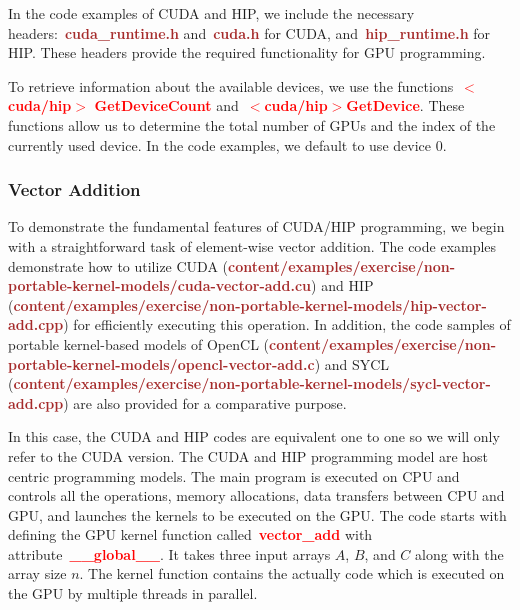 


\par
In the code examples of CUDA and HIP, we include the necessary headers:~\textbf{\textcolor{brown}{cuda\_runtime.h}} and~\textbf{\textcolor{brown}{cuda.h}} for CUDA, and~\textbf{\textcolor{brown}{hip\_runtime.h}} for HIP.
These headers provide the required functionality for GPU programming.


\par
To retrieve information about the available devices, we use the functions~\textbf{\textcolor{red}{$<$cuda/hip$>$}} \textbf{\textcolor{red}{GetDeviceCount}} and~\textbf{\textcolor{red}{$<$cuda/hip$>$GetDevice}}.
These functions allow us to determine the total number of GPUs and the index of the currently used device.
In the code examples, we default to use device 0.


\subsubsection{Vector Addition}\label{sec:vector_addition}


\par
To demonstrate the fundamental features of CUDA/HIP programming, we begin with a straightforward task of element-wise vector addition.
The code examples demonstrate how to utilize CUDA (\textbf{\textcolor{brown}{content/examples/exercise/non-portable-kernel-models/cuda-vector-add.cu}}) and HIP (\textbf{\textcolor{brown}{content/examples/exercise/non-portable-kernel-models/hip-vector-add.cpp}}) for efficiently executing this operation.
In addition, the code samples of portable kernel-based models of OpenCL (\textbf{\textcolor{brown}{content/examples/exercise/non-portable-kernel-models/opencl-vector-add.c}}) and SYCL (\textbf{\textcolor{brown}{content/examples/exercise/non-portable-kernel-models/sycl-vector-add.cpp}}) are also provided for a comparative purpose.


\par
In this case, the CUDA and HIP codes are equivalent one to one so we will only refer to the CUDA version.
The CUDA and HIP programming model are host centric programming models.
The main program is executed on CPU and controls all the operations, memory allocations, data transfers between CPU and GPU, and launches the kernels to be executed on the GPU.
The code starts with defining the GPU kernel function called~\textbf{\textcolor{red}{vector\_add}} with attribute~\textbf{\textcolor{red}{\_\_global\_\_}}.
It takes three input arrays $A$, $B$, and $C$ along with the array size $n$.
The kernel function contains the actually code which is executed on the GPU by multiple threads in parallel.


